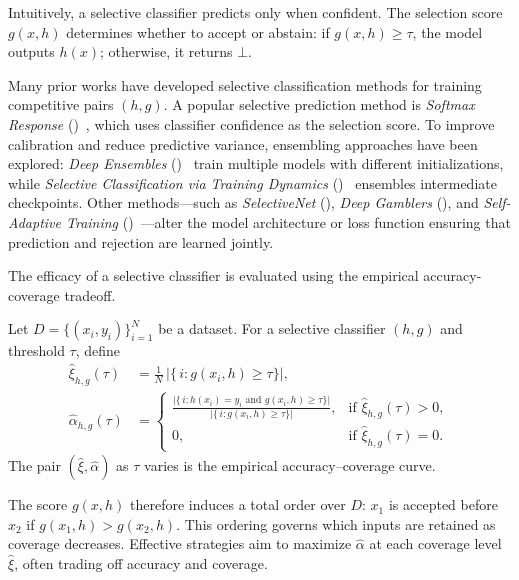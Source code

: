 Intuitively, a selective classifier predicts only when confident.  
The selection score \(g(x, h)\) determines whether to accept or abstain: if \(g(x, h) \geq \tau\), the model outputs \(h(x)\); otherwise, it returns \(\bot\).

Many prior works have developed selective classification methods for training competitive pairs \((h, g)\).  
A popular selective prediction method is \emph{Softmax Response} (\sr)~\citep{hendrycks2016baseline, geifman2017selective}, which uses classifier confidence as the selection score.  
To improve calibration and reduce predictive variance, ensembling approaches have been explored: \emph{Deep Ensembles} (\de)~\citep{lakshminarayanan2017simple} train multiple models with different initializations, while \emph{Selective Classification via Training Dynamics} (\sctd)~\citep{rabanser2022selective} ensembles intermediate checkpoints.  
Other methods—such as \emph{SelectiveNet} (\sn)\citep{geifman2019selectivenet}, \emph{Deep Gamblers} (\dg)\citep{liu2019deep}, and \emph{Self-Adaptive Training} (\sat)~\citep{huang2020self}—alter the model architecture or loss function ensuring that prediction and rejection are learned jointly.




The efficacy of a selective classifier is evaluated using the empirical accuracy-coverage tradeoff.

\begin{definition}
\label{def:emp_acc_cov}
Let \(D=\{(x_i,y_i)\}_{i=1}^N\) be a dataset.  For a selective classifier \((h,g)\) and threshold \(\tau\), define
\begin{align}
\label{eq:emp_coverage}
\hat{\xi}_{h,g}(\tau)
&= \frac{1}{N}\,\bigl|\{\,i : g(x_i,h) \ge \tau \}\bigr|,
\\[6pt]
\label{eq:emp_accuracy}
\hat{\alpha}_{h,g}(\tau)
&= 
\begin{cases}
\displaystyle
\frac{\bigl|\{\,i : h(x_i)=y_i \text{ and } g(x_i,h) \ge \tau \}\bigr|}{
      \bigl|\{\,i : g(x_i,h) \ge \tau \}\bigr|}, 
& \text{if } \hat{\xi}_{h,g}(\tau)>0,\\[10pt]
0, & \text{if } \hat{\xi}_{h,g}(\tau)=0.
\end{cases}
\end{align}
The pair \((\hat{\xi}, \hat{\alpha})\) as \(\tau\) varies is the empirical accuracy–coverage curve.
\end{definition}
The score \(g(x,h)\) therefore induces a total order over \(D\): \(x_1\) is accepted before \(x_2\) if \(g(x_1,h) > g(x_2,h)\).  
This ordering governs which inputs are retained as coverage decreases.  
Effective strategies aim to maximize \(\hat{\alpha}\) at each coverage level \(\hat{\xi}\), often trading off accuracy and coverage.

